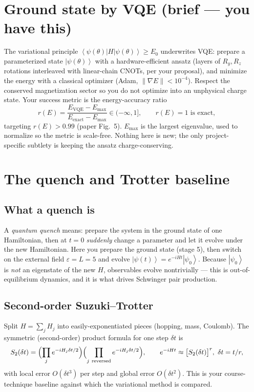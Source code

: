 \documentclass[11pt,a4paper]{article}
\newcommand{\ket}[1]{\left|#1\right\rangle}
\newcommand{\ev}[1]{\left\langle#1\right\rangle}
\begin{document}
\section{Ground state by VQE (brief --- you have this)}\label{sec:vqe}
The variational principle $\ev{\psi(\theta)|H|\psi(\theta)}\ge E_0$ underwrites VQE: prepare a
parameterized state $\ket{\psi(\theta)}$ with a hardware-efficient ansatz (layers of $R_y,R_z$
rotations interleaved with linear-chain CNOTs, per your proposal), and minimize the energy with a
classical optimizer (Adam, $\|\nabla E\|<10^{-4}$). Respect the conserved magnetization sector so
you do not optimize into an unphysical charge state. Your success metric is the energy-accuracy ratio
\begin{equation}
r(E)=\frac{E_{\text{VQE}}-E_{\max}}{E_{\text{exact}}-E_{\max}}\in(-\infty,1],
\qquad r(E)=1 \text{ is exact},
\label{eq:rE}
\end{equation}
targeting $r(E)>0.99$ (paper Fig.~5). $E_{\max}$ is the largest eigenvalue, used to normalize so the
metric is scale-free. Nothing here is new; the only project-specific subtlety is keeping the ansatz
charge-conserving.

\section{The quench and Trotter baseline}\label{sec:trotter}

\subsection{What a quench is}
A \emph{quantum quench} means: prepare the system in the ground state of one Hamiltonian, then at
$t=0$ \emph{suddenly} change a parameter and let it evolve under the new Hamiltonian. Here you prepare
the ground state (stage 5), then switch on the external field $\varepsilon=L=5$ and evolve
$\ket{\psi(t)}=e^{-iHt}\ket{\psi_0}$. Because $\ket{\psi_0}$ is \emph{not} an eigenstate of the new
$H$, observables evolve nontrivially --- this is out-of-equilibrium dynamics, and it is what drives
Schwinger pair production.

\subsection{Second-order Suzuki--Trotter}
Split $H=\sum_j H_j$ into easily-exponentiated pieces (hopping, mass, Coulomb). The symmetric
(second-order) product formula for one step $\delta t$ is
\begin{equation}
S_2(\delta t)=\Bigl(\prod_{j} e^{-iH_j \delta t/2}\Bigr)\Bigl(\prod_{j\ \text{reversed}} e^{-iH_j \delta t/2}\Bigr),
\qquad e^{-iHt}\approx \big[S_2(\delta t)\big]^{r},\ \delta t=t/r,
\label{eq:suzuki}
\end{equation}
with local error $O(\delta t^3)$ per step and global error $O(\delta t^2)$. This is your
course-technique baseline against which the variational method is compared.
\end{document}
